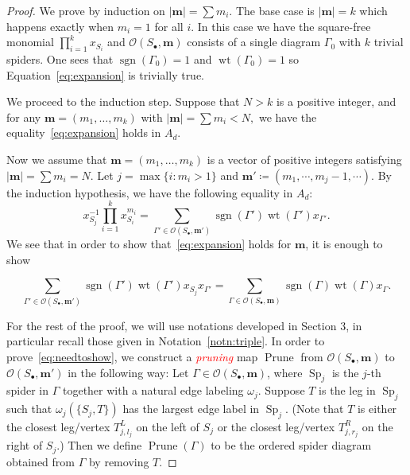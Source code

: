 \documentclass[10pt,a4paper]{amsart}
\theoremstyle{definition}
\newcommand{\bm}[1]{{\boldsymbol{#1}}}
\newcommand\m{\bm{m}}
\newcommand{\important}[1]{\emph{\textcolor{red}{#1}}}
\DeclareMathOperator{\wt}{wt}
\DeclareMathOperator{\prune}{Prune}
\DeclareMathOperator{\Sp}{Sp}
\DeclareMathOperator{\sgn}{sgn}
\newcommand{\D}{{\Gamma}}
\newcommand{\lspd}{\mathcal O}
\begin{document}
\begin{proof}
	
	We prove by induction on $|\m|=\sum m_i$. 
	The base case is $|\m| = k$ which happens exactly when $m_i=1$ for all $i$. In this case we have the square-free monomial $\prod_{i=1}^k x_{S_i}$ and $\lspd(S_\bullet,\m)$ consists of a single diagram $\D_0$ with $k$ trivial spiders. One sees that $\sgn(\D_0)=1$ and $\wt(\D_0)=1$ so Equation~\eqref{eq:expansion} is trivially true.
	
	We proceed to the induction step. Suppose that $N > k$ is a positive integer, and for any $\m=(m_1, \dots, m_k)$ with $|\m| = \sum m_i < N,$ we have the equality~\eqref{eq:expansion} holds in $A_d.$
	
	Now we assume that $\m=(m_1, \dots, m_k)$ is a vector of positive integers satisfying $|\m| = \sum m_i =N.$
	Let $j=\max\{i:m_i>1\}$ and $\m'\coloneqq (m_1,\cdots,m_j-1,\cdots)$. By the induction hypothesis, we have the following equality in $A_d:$
	\begin{equation}\label{eq:induction}
	x_{S_j}^{-1}\prod_{i=1}^k x_{S_i}^{m_i}=\sum_{\D'\in\lspd(S_\bullet,\m')}\sgn(\D')\wt(\D')x_{\D'}.
	\end{equation}
	We see that in order to show that~\eqref{eq:expansion} holds for $\m$, it is enough to show
	
	\begin{equation}\label{eq:needtoshow}
	\sum_{\D'\in\lspd(S_\bullet,\m')}\sgn(\D')\wt(\D')x_{S_j}x_{\D'} = \sum_{\D\in\lspd(S_\bullet,\m)}\sgn(\D)\wt(\D)x_\D.
	\end{equation}
	
	
	
	For the rest of the proof, we will use notations developed in Section 3, in particular recall those given in Notation~\ref{notn:triple}.
	In order to prove~\eqref{eq:needtoshow}, we construct a \important{pruning} map $\prune$ from $\lspd(S_\bullet,\m)$ to $\lspd(S_\bullet, \m')$ in the following way: Let $\D \in \lspd(S_\bullet,\m)$, where $\Sp_j$ is the $j$-th spider in $\D$ together with a natural edge labeling $\omega_j$. Suppose $T$ is the leg in $\Sp_j$ such that $\omega_j\left(\{S_j,T\}\right)$ has the largest edge label in $\Sp_j$. (Note that $T$ is either the closest leg/vertex $T^L_{j,l_j}$ on the left of $S_j$ or the closest leg/vertex $T^R_{j,r_j}$ on the right of $S_j$.) Then we define $\prune(\D)$ to be the ordered spider diagram obtained from $\D$ by removing $T$.
	

\end{proof}
\end{document}
